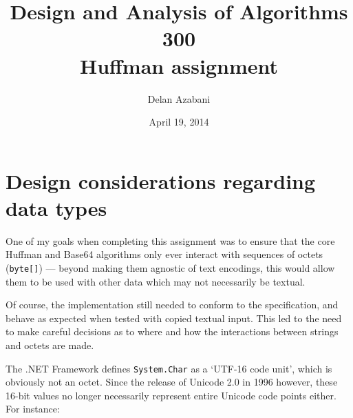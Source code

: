\documentclass[a4paper,titlepage,12pt]{article}
\title{Design and Analysis of Algorithms 300\\Huffman assignment}
\date{April 19, 2014}
\author{Delan Azabani}
\begin{document}
\maketitle

\section{Design considerations regarding data types}

One of my goals when completing this assignment was to ensure that the core
Huffman and Base64 algorithms only ever interact with sequences of octets
(\texttt{byte[]}) --- beyond making them agnostic of text encodings, this would
allow them to be used with other data which may not necessarily be textual.

Of course, the implementation still needed to conform to the specification, and
behave as expected when tested with copied textual input. This led to the need
to make careful decisions as to where and how the interactions between strings
and octets are made.

The .NET Framework defines \texttt{System.Char} as a `UTF-16 code unit', which
is obviously not an octet. Since the release of Unicode 2.0 in 1996 however,
these 16-bit values no longer necessarily represent entire Unicode code points
either. For instance:
\end{document}
